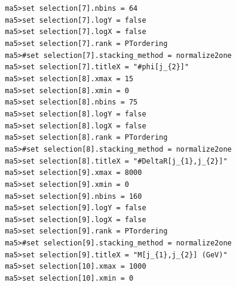 \documentclass[a4paper, 10pt]{article}
\begin{document}
\texttt{ }\texttt{ }\texttt{ma5>set selection[7].nbins = 64\\
}
\texttt{ }\texttt{ }\texttt{ma5>set selection[7].logY = false\\
}
\texttt{ }\texttt{ }\texttt{ma5>set selection[7].logX = false\\
}
\texttt{ }\texttt{ }\texttt{ma5>set selection[7].rank = PTordering\\
}
\texttt{ }\texttt{ }\texttt{ma5>\#set selection[7].stacking\_method = normalize2one\\
}
\texttt{ }\texttt{ }\texttt{ma5>set selection[7].titleX = "\#phi[j\_\{2\}]"\\
}
\texttt{ }\texttt{ }\texttt{ma5>set selection[8].xmax = 15\\
}
\texttt{ }\texttt{ }\texttt{ma5>set selection[8].xmin = 0\\
}
\texttt{ }\texttt{ }\texttt{ma5>set selection[8].nbins = 75\\
}
\texttt{ }\texttt{ }\texttt{ma5>set selection[8].logY = false\\
}
\texttt{ }\texttt{ }\texttt{ma5>set selection[8].logX = false\\
}
\texttt{ }\texttt{ }\texttt{ma5>set selection[8].rank = PTordering\\
}
\texttt{ }\texttt{ }\texttt{ma5>\#set selection[8].stacking\_method = normalize2one\\
}
\texttt{ }\texttt{ }\texttt{ma5>set selection[8].titleX = "\#DeltaR[j\_\{1\},j\_\{2\}]"\\
}
\texttt{ }\texttt{ }\texttt{ma5>set selection[9].xmax = 8000\\
}
\texttt{ }\texttt{ }\texttt{ma5>set selection[9].xmin = 0\\
}
\texttt{ }\texttt{ }\texttt{ma5>set selection[9].nbins = 160\\
}
\texttt{ }\texttt{ }\texttt{ma5>set selection[9].logY = false\\
}
\texttt{ }\texttt{ }\texttt{ma5>set selection[9].logX = false\\
}
\texttt{ }\texttt{ }\texttt{ma5>set selection[9].rank = PTordering\\
}
\texttt{ }\texttt{ }\texttt{ma5>\#set selection[9].stacking\_method = normalize2one\\
}
\texttt{ }\texttt{ }\texttt{ma5>set selection[9].titleX = "M[j\_\{1\},j\_\{2\}] (GeV)"\\
}
\texttt{ }\texttt{ }\texttt{ma5>set selection[10].xmax = 1000\\
}
\texttt{ }\texttt{ }\texttt{ma5>set selection[10].xmin = 0\\
}
\end{document}
